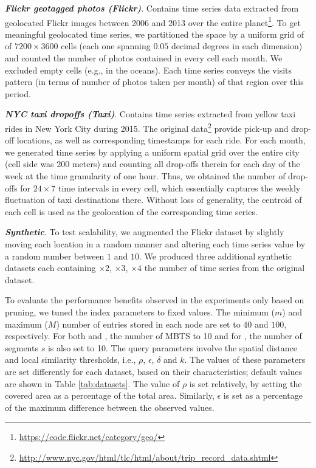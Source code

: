 \vspace{2mm}

\noindent \emph{\textbf{Flickr geotagged photos (Flickr)}}. Contains time series data extracted from geolocated Flickr images between 2006 and 2013 over the entire planet\footnote{\url{https://code.flickr.net/category/geo/}}. To get meaningful geolocated time series, we partitioned the space by a uniform grid of of $7200 \times 3600$ cells (each one spanning $0.05$ decimal degrees in each dimension) and counted the number of photos contained in every cell each month. We excluded empty cells (e.g., in the oceans). Each time series conveys the visits pattern (in terms of number of photos taken per month) of that region over this period.

\vspace{2mm}

\noindent \emph{\textbf{NYC taxi dropoffs (Taxi)}}. Contains time series extracted from yellow taxi rides in New York City during 2015. The original data\footnote{\url{http://www.nyc.gov/html/tlc/html/about/trip_record_data.shtml}} provide pick-up and drop-off locations, as well as corresponding timestamps for each ride. For each month, we generated time series by applying a uniform spatial grid over the entire city (cell side was 200 meters) and counting all drop-offs therein for each day of the week at the time granularity of one hour. Thus, we obtained the number of drop-offs for $24 \times 7$ time intervals in every cell, which essentially captures the weekly fluctuation of taxi destinations there. Without loss of generality, the centroid of each cell is used as the geolocation of the corresponding time series. 

\vspace{2mm}

\noindent \emph{\textbf{Synthetic}}. To test scalability, we augmented the Flickr dataset by slightly moving each location in a random manner and altering each time series value by a random number between $1$ and $10$. We produced three additional synthetic datasets each containing $\times 2$, $\times 3$, $\times 4$ the number of time series from the original dataset. 


To evaluate the performance benefits observed in the experiments only based on pruning, we tuned the index parameters to fixed values. The minimum ($m$) and maximum ($M$) number of entries stored in each node are set to $40$ and $100$, respectively. For both \btsr and \sbtsr, the number of MBTS to 10 and for \sbtsr, the number of segments $s$ is also set to 10. The query parameters involve the spatial distance and local similarity thresholds, i.e., $\rho$, $\epsilon$, $\delta$ and $k$. The values of these parameters are set differently for each dataset, based on their characteristics; default values are shown in Table \ref{tab:datasets}. The value of $\rho$ is set relatively, by setting the covered area as a percentage of the total area. Similarly, $\epsilon$ is set as a percentage of the maximum difference between the observed values.


